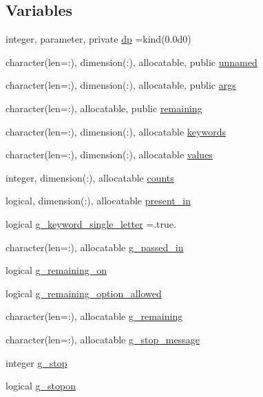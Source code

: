 \subsection*{Variables}
\begin{DoxyCompactItemize}
\item 
integer, parameter, private \mbox{\hyperlink{namespacem__cli2_acf83f1963cf6a56ad0221cfcf5402440}{dp}} =kind(0.\+0d0)
\item 
character(len=\+:), dimension(\+:), allocatable, public \mbox{\hyperlink{namespacem__cli2_a5b03781cb432174f4ee8d734ecbb9604}{unnamed}}
\item 
character(len=\+:), dimension(\+:), allocatable, public \mbox{\hyperlink{namespacem__cli2_a601970031be3351d1f14ce671934ffe7}{args}}
\item 
character(len=\+:), allocatable, public \mbox{\hyperlink{namespacem__cli2_ae158de0b5e1d1a55bb297ed576e38273}{remaining}}
\item 
character(len=\+:), dimension(\+:), allocatable \mbox{\hyperlink{namespacem__cli2_a314f3903115db4ab9e2ec03b540aec76}{keywords}}
\item 
character(len=\+:), dimension(\+:), allocatable \mbox{\hyperlink{namespacem__cli2_af631ee3a1bca98e9fbf1f80646dae360}{values}}
\item 
integer, dimension(\+:), allocatable \mbox{\hyperlink{namespacem__cli2_abf81746a55c2218c7f2de15602bc0be8}{counts}}
\item 
logical, dimension(\+:), allocatable \mbox{\hyperlink{namespacem__cli2_adf9ffb8a34d1bd666fa91ed953bcb9f4}{present\+\_\+in}}
\item 
logical \mbox{\hyperlink{namespacem__cli2_ad1fe6713ae917008c41792b9cad267b7}{g\+\_\+keyword\+\_\+single\+\_\+letter}} =.true.
\item 
character(len=\+:), allocatable \mbox{\hyperlink{namespacem__cli2_a1945bae73d2d148bb01a15d89acd07cd}{g\+\_\+passed\+\_\+in}}
\item 
logical \mbox{\hyperlink{namespacem__cli2_a81306eb55af0b7b6ab8aa2851c0bd8be}{g\+\_\+remaining\+\_\+on}}
\item 
logical \mbox{\hyperlink{namespacem__cli2_af16d24ebf98bf90f8c7c32dda70eeb43}{g\+\_\+remaining\+\_\+option\+\_\+allowed}}
\item 
character(len=\+:), allocatable \mbox{\hyperlink{namespacem__cli2_a9ff84c9aa401e7b45d9d86cd6b17bbcc}{g\+\_\+remaining}}
\item 
character(len=\+:), allocatable \mbox{\hyperlink{namespacem__cli2_a0afc43936eba64e78b8920742ffb71e1}{g\+\_\+stop\+\_\+message}}
\item 
integer \mbox{\hyperlink{namespacem__cli2_a07a17fd130c21dd97917a0f415cf302b}{g\+\_\+stop}}
\item 
logical \mbox{\hyperlink{namespacem__cli2_ac2ad61c8af780de83b4adecc5d735d8b}{g\+\_\+stopon}}
\end{DoxyCompactItemize}


